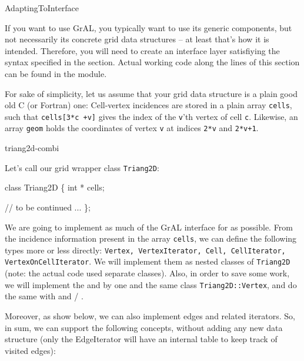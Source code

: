 \begin{Label}{AdaptingToInterface}
\end{Label}


If you want to use GrAL, you typically want to use its generic
components, but not necessarily its concrete grid data structures
-- at least that's how it is intended.
Therefore, you will need to create an interface layer 
satisfiying the syntax specified in the  section.
Actual working code along the lines of this section 
can be found in the  module.

For sake of simplicity, let us assume that your grid data structure
is a plain  good old C (or Fortran) one:
Cell-vertex incidences are stored in a plain array \texttt{cells},
such that \texttt{cells[3*c +v]} gives the index of the \texttt{v}'th vertex
of cell \texttt{c}. 
Likewise, an array \texttt{geom} 
holds the coordinates of vertex \texttt{v}
at indices \texttt{2*v} and \texttt{2*v+1}.

\begin{Label}{triang2d-combi}
\end{Label}

Let's call our grid wrapper class \texttt{Triang2D}:
\begin{example}
class Triang2D \{
  int * cells;

  // to be continued ...
\};
\end{example}
We are going to implement as much of the GrAL interface for 
as possible.
From the incidence information present in the array \texttt{cells},
we can define  the following types more or less directly:
\texttt{Vertex, VertexIterator, Cell, CellIterator, VertexOnCellIterator}.
We will implement them as nested classes of \texttt{Triang2D}
(note: the actual code used separate classes).
Also, in order to save some work, we will implement the
 and  
by one and the same class
\texttt{Triang2D::Vertex},
and do the same with 
and   / .


Moreover, as show below, we can also implement edges and related iterators.
So, in sum, we can support the following concepts,
without adding any new data structure
(only the EdgeIterator will have an internal table to keep track of visited edges):

